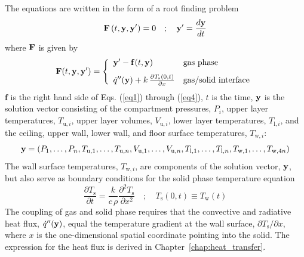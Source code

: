 \documentclass[12pt,twoside]{book}
\begin{document}
The equations are written in the form of a root finding problem
\begin{equation}
\mathbf{F}\left( t,\mathbf{y},\mathbf{y}' \right)=0 \quad ; \quad \mathbf{y}' = \frac{ d\mathbf{y}}{dt}
\end{equation}
where $\mathbf{F}$ is given by
\begin{equation}
\mathbf{F}(t,\mathbf{y},\mathbf{y}')=\left\{ \begin{array}{ll}
  \mathbf{y}'-\mathbf{f}(t,\mathbf{y}) & \text{gas phase} \\[.1in]
  \dot{q}''(\mathbf{y}) +k \, \frac{\partial T_{\mathrm{s}}(0,t)}{\partial x} & \text{gas/solid interface} \label{eq:resid}
\end{array} \right.
\end{equation}
$\mathbf{f}$ is the right hand side of Eqs. (\ref{eq1}) through (\ref{eq4}), $t$ is the time, $\mathbf{y}$ is the solution vector consisting of the compartment pressures, $P_i$, upper layer temperatures, $T_{{\mathrm{u}},i}$, upper layer volumes, $V_{{\mathrm{u}},i}$, lower layer temperatures, $T_{{\mathrm{l}},i}$, and the ceiling, upper wall, lower wall, and floor surface temperatures, $T_{{\mathrm{w}},i}$:
\begin{equation}
   \mathbf{y} = (P_1, \ldots , P_n, T_{{\mathrm{u}},1}, \ldots , T_{{\mathrm{u}},n} , V_{{\mathrm{u}},1}, \ldots , V_{{\mathrm{u}},n}, T_{{\mathrm{l}},1}, \ldots ,T_{{\mathrm{l}},n}, T_{{\mathrm{w}},1}, \ldots, T_{{\mathrm{w}},4n} )
\end{equation}
The wall surface temperatures, $T_{{\mathrm{w}},i}$, are components of the solution vector, $\mathbf{y}$, but also serve as boundary conditions for the solid phase temperature equation
\begin{equation}
   \frac{\partial T_{\mathrm{s}}}{\partial t} = \frac{k}{c \, \rho} \frac{\partial^2 T_{\mathrm{s}}}{\partial x^2} \quad ; \quad T_{\mathrm{s}}(0,t) \equiv T_{\mathrm{w}}(t) \label{eq:fouriera}
\end{equation}
The coupling of gas and solid phase requires that the convective and radiative heat flux, $\dot{q}''(\mathbf{y})$, equal the temperature gradient at the wall surface, $\partial T_{\mathrm{s}} / \partial x$, where $x$ is the one-dimensional spatial coordinate pointing into the solid. The expression for the heat flux is derived in Chapter~\ref{chap:heat_transfer}.
\end{document}

